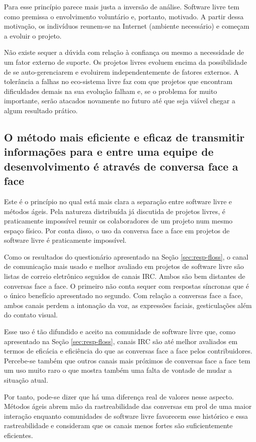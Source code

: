 Para esse princípio parece mais justa a inversão de análise. Software
livre tem como premissa o envolvimento voluntário e, portanto,
motivado. A partir dessa motivação, os indivíduos reunem-se na
Internet (ambiente necessário) e começam a evoluir o projeto.

Não existe sequer a dúvida com relação à confiança ou mesmo a
necessidade de um fator externo de suporte. Os projetos livres evoluem
encima da possibilidade de se auto-gerenciarem e evoluirem
independentemente de fatores externos. A tolerância a falhas no
eco-sistema livre faz com que projetos que encontram dificuldades
demais na sua evolução falham e, se o problema for muito importante,
serão atacados novamente no futuro até que seja viável chegar a algum
resultado prático.

\subsection{O método mais eficiente e eficaz de transmitir informações
  para e entre uma equipe de desenvolvimento é através de conversa
  face a face}

Este é o princípio no qual está mais clara a separação entre software
livre e métodos ágeis. Pela natureza distribuída já discutida de
projetos livres, é praticamente impossível reunir os colaboradores de
um projeto num mesmo espaço físico. Por conta disso, o uso da conversa
face a face em projetos de software livre é praticamente impossível.

Como os resultados do questionário apresentado na Seção
\ref{sec:resp-floss}, o canal de comunicação mais usado e melhor
avaliado em projetos de software livre são listas de correio
eletrônico seguidos de canais IRC. Ambos são bem distantes de
conversas face a face. O primeiro não conta sequer com respostas
síncronas que é o único benefício apresentado no segundo. Com relação
a conversas face a face, ambos canais perdem a intonação da voz, as
expressões faciais, gesticulações além do contato visual.

Esse uso é tão difundido e aceito na comunidade de software livre que,
como apresentado na Seção \ref{sec:resp-floss}, canais IRC são até
melhor avaliados em termos de eficácia e eficiência do que as
conversas face a face pelos contribuidores. Percebe-se também que
outros canais mais próximos de conversas face a face tem um uso muito
raro o que mostra também uma falta de vontade de mudar a situação
atual.

Por tanto, pode-se dizer que há uma diferença real de valores nesse
aspecto. Métodos ágeis abrem mão da rastreabilidade das conversas em
prol de uma maior interação enquanto comunidades de software livre
favorecem esse histórico e essa rastreabilidade e consideram que os
canais menos fortes são suficientemente eficientes.

